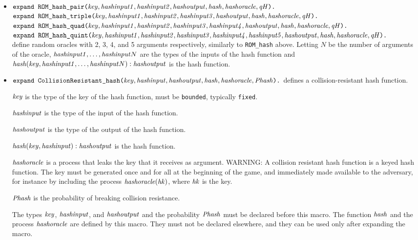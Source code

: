 \documentclass{article}
\begin{document}
\begin{itemize}
 \item
   $\texttt{expand ROM\_hash\_pair(}\mathit{key}, \mathit{hashinput1}, \mathit{hashinput2}, \mathit{hashoutput}, \mathit{hash}, \mathit{hashoracle}, \mathit{qH}\texttt{).}$\\
   $\texttt{expand ROM\_hash\_triple(}\mathit{key}, \mathit{hashinput1}, \mathit{hashinput2}, \mathit{hashinput3}, \mathit{hashoutput}, \mathit{hash}, \mathit{hashoracle}, \mathit{qH}\texttt{).}$\\
$\texttt{expand ROM\_hash\_quad(}\mathit{key}, \mathit{hashinput1}, \mathit{hashinput2}, \mathit{hashinput3}, \mathit{hashinput4}, \mathit{hashoutput}, \mathit{hash}, \mathit{hashoracle}, \mathit{qH}\texttt{).}$\\
$\texttt{expand ROM\_hash\_quint(}\mathit{key}, \mathit{hashinput1}, \mathit{hashinput2}, \mathit{hashinput3}, \mathit{hashinput4}, \mathit{hashinput5}, \mathit{hashoutput}, \mathit{hash}, \mathit{hashoracle}, \mathit{qH}\texttt{).}$\\
   define random oracles with 2, 3, 4, and 5 arguments respectively, similarly to \texttt{ROM\_hash} above.
   Letting $N$ be the number of arguments of the oracle,
   $\mathit{hashinput1},\dots,\mathit{hashinput}N$ are the types of the inputs of the hash function and
   $\mathit{hash}(\mathit{key}, \mathit{hashinput1}, \dots, \mathit{hashinput}N): \mathit{hashoutput}$ is the hash function.

\item $\texttt{expand CollisionResistant\_hash(}\mathit{key}, \mathit{hashinput}, \mathit{hashoutput}, \mathit{hash}, \mathit{hashoracle}, \mathit{Phash}\texttt{).}$
defines a collision-resistant hash function.

   $\mathit{key}$ is the type of the key of the hash function, must be \texttt{bounded}, typically \texttt{fixed}.

   $\mathit{hashinput}$ is the type of the input of the hash function.

   $\mathit{hashoutput}$ is the type of the output of the hash function.

   $\mathit{hash}(\mathit{key}, \mathit{hashinput}): \mathit{hashoutput}$ is the hash function.

   $\mathit{hashoracle}$ is a process that leaks the key that it receives as argument.
   WARNING: A collision resistant hash function is a keyed hash function.
   The key must be generated once and for all at the beginning of the game,
   and immediately made available to the adversary, for instance
   by including the process $\mathit{hashoracle}(\mathit{hk})$,
   where $\mathit{hk}$ is the key.

   $\mathit{Phash}$ is the probability of breaking collision resistance.

   The types $\mathit{key}$, $\mathit{hashinput}$, and $\mathit{hashoutput}$ and
   the probability $\mathit{Phash}$ must be declared before this macro.
   The function $\mathit{hash}$ and the process $\mathit{hashoracle}$ are
   defined by this macro. They must not be declared elsewhere, and
   they can be used only after expanding the macro.


\end{itemize}
\end{document}
